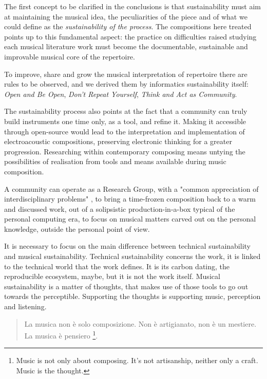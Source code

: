 \documentclass[twoside,a4paper]{article}
\begin{document}
The first concept to be clarified in the conclusions is that sustainability must
aim at maintaining the musical idea, the peculiarities of the piece and of what
we could define as the \emph{sustainability of the process}. The compositions
here treated points up to this fundamental aspect: the practice on difficulties
raised studying each musical literature work must become the documentable,
sustainable and improvable musical core of the repertoire.

To improve, share and grow the musical interpretation of repertoire there are
rules to be observed, and we derived them by informatics sustainability itself:
\emph{Open and Be Open}, \emph{Don't Repeat Yourself}, \emph{Think and Act as
Community}.

The sustainability process also points at the fact that a community can truly
build instruments one time only, as a tool, and refine it. Making it accessible
through open-source would lead to the interpretation and implementation of
electroacoustic compositions, preserving electronic thinking for a greater
progression. Researching within contemporary composing means untying the
possibilities of realisation from tools and means available during music
composition.

A community can operate as a Research Group, with a "common appreciation of
interdisciplinary problems" \cite{ml91}, to bring a time-frozen composition back
to a warm and discussed work, out of a solipsistic production-in-a-box typical
of the personal computing era, to focus on musical matters carved out on the
personal knowledge, outside the personal point of view.

It is necessary to focus on the main difference between technical sustainability
and musical sustainability. Technical sustainability concerns the work, it is
linked to the technical world that the work defines. It is its carbon dating, the
reproducible ecosystem, maybe, but it is not the work itself. Musical
sustainability is a matter of thoughts, that makes use of those tools to go out
towards the perceptible. Supporting the thoughts is supporting music, perception
and listening.

\begin{quote}
La musica non è solo composizione. Non è artigianato, non è un mestiere. La
musica è pensiero \cite{nono85}\footnote{Music is not only about composing.
It's not artisanship, neither only a craft. Music is the thought.}.
\end{quote}
%
\end{document}
